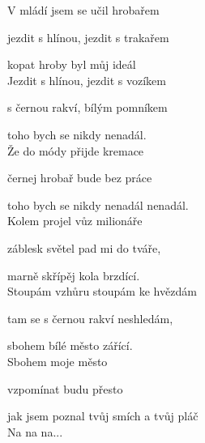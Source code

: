 
V mládí jsem se učil hrobařem

jezdit s hlínou, jezdit s trakařem

kopat hroby byl můj ideál \hspace{0.1cm} \\


Jezdit s hlínou, jezdit s vozíkem

s černou rakví, bílým pomníkem

toho bych se nikdy nenadál.\\

Že do módy přijde kremace

černej hrobař bude bez práce

toho bych se nikdy nenadál nenadál.\\

Kolem projel vůz milionáře

záblesk světel pad mi do tváře,

marně skřípěj kola brzdící.\\

Stoupám vzhůru stoupám ke hvězdám

tam se s černou rakví neshledám,

sbohem bílé město zářící.\\

Sbohem moje město

vzpomínat budu přesto

jak jsem poznal tvůj smích a tvůj pláč\\

Na na na...

\newpage
